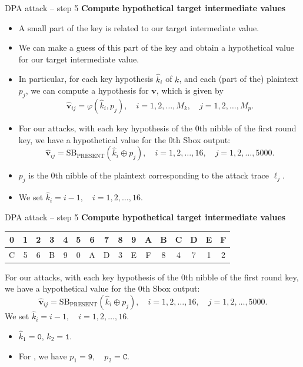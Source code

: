 \begin{frame}{DPA attack -- step 5}
\textbf{Compute hypothetical target intermediate values}
    \begin{itemize}
        \item A small part of the key is related to our target intermediate value.
        \item We can make a guess of this part of the key and obtain a hypothetical value for our target intermediate value.
        \item In particular, for each key hypothesis $\hat{k}_i$ of $k$, and each (part of the) plaintext $p_j$, we can compute a hypothesis for $\boldsymbol{v}$, which is given by
    \[
    \hat{\boldsymbol{v}}_{ij}=\varphi(\hat{k}_i,p_j),\quad i=1,2,\dots,M_k,\quad j=1,2,\dots,M_p.
    \]
    \end{itemize}
    \begin{example}
    \begin{itemize}
    \item For our attacks, with each key hypothesis of the $0$th nibble of the first round key, we have a hypothetical value for the $0$th Sbox output:
    \[
    \hat{\boldsymbol{v}}_{ij}=\text{SB}_{\text{PRESENT}}(\hat{k}_i\oplus p_j),\quad i=1,2,\dots,16,\quad j=1,2,\dots,5000.
    \]
        \item  $p_j$ is the $0$th nibble of the plaintext corresponding to the attack trace $\boldsymbol{\ell}_j$.
        \item We set $\hat{k}_i=i-1,\quad i=1,2,\dots,16.$
    \end{itemize}
    \end{example}
\end{frame}

\begin{frame}{DPA attack -- step 5}
    \textbf{Compute hypothetical target intermediate values}
    \begin{table}[htb]
\centering
\ttfamily
\begin{tabular}{cccccccccccccccc}\hline
 0 & 1 & 2 & 3 & 4 & 5 & 6 & 7 & 8 & 9 & A & B & C & D & E & F \\\hline
 C & 5 & 6 & B & 9 & 0 & A & D & 3 & E & F & 8 & 4 & 7 & 1 & 2\\\hline
\end{tabular}
\end{table}
    \begin{example}
        For our attacks, with each key hypothesis of the $0$th nibble of the first round key, we have a hypothetical value for the $0$th Sbox output:
    \[
    \hat{\boldsymbol{v}}_{ij}=\text{SB}_{\text{PRESENT}}(\hat{k}_i\oplus p_j),\quad i=1,2,\dots,16,\quad j=1,2,\dots,5000.
    \]
    We set $\hat{k}_i=i-1,\quad i=1,2,\dots,16.$
    \begin{itemize}
    \item $\hat{k}_1=\texttt{0}$, $\hat{k}_2=\texttt{1}$.
    \item For \dataranone, we have $p_1=\texttt{9},\quad p_2=\texttt{C}.$
    \end{itemize}
    \end{example}
\end{frame}

